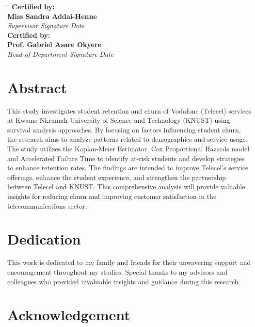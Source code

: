 \documentclass[12pt]{report} %
\begin{document}
\begin{tabbing}
 \hspace{6cm} \= \hspace{4cm} \= \hspace{5cm} \kill
     \textbf{Certified by:}\\ 
    \textbf{Miss Sandra Addai-Henne} \> \makebox[3cm]{\dotfill} \> \makebox[3cm]{\dotfill} \\
    \textit{Supervisor} \> \textit{Signature} \> \textit{Date} \\[1.5cm]
    \textbf{Certified by:}\\ 
\textbf{Prof. Gabriel Asare Okyere } \> \makebox[3cm]{\dotfill} \> \makebox[3cm]{\dotfill} \\
    \textit{Head of Department} \> \textit{Signature} \> \textit{Date}
\end{tabbing}



 
\newpage
\chapter*{Abstract}
This study investigates student retention and churn of Vodafone (Telecel) services at Kwame Nkrumah University of Science and Technology (KNUST) using survival analysis approaches. By focusing on factors influencing student churn, the research aims to analyze patterns related to demographics and service usage. The study utilizes the Kaplan-Meier Estimator, Cox Proportional Hazards model and Accelerated Failure Time to identify at-risk students and develop strategies to enhance retention rates. The findings are intended to improve Telecel’s service offerings, enhance the student experience, and strengthen the partnership between Telecel and KNUST. This comprehensive analysis will provide valuable insights for reducing churn and improving customer satisfaction in the telecommunications sector.

\newpage
\chapter*{Dedication}
This work is dedicated to my family and friends for their unwavering support and encouragement throughout my studies. Special thanks to my advisors and colleagues who provided invaluable insights and guidance during this research.

\newpage
\chapter*{Acknowledgement}
\end{document}
